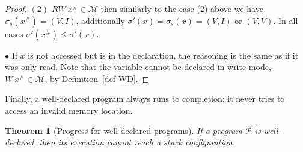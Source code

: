 \documentclass[preprint,12pt]{elsarticle}
\newtheorem{Theorem}{Theorem}
\newcommand{\abs}[1]{#1^\#}
\newcommand{\AM}{\mathcal{M}}
\newcommand{\Prog}{\mathcal{P}}
\begin{document}
\begin{proof}
\noindent$(2)$ $RW~\abs x \in \AM$ then similarly to the case (2) above we have 
$\sigma_s(\abs x)=(V,I)$, additionally $\sigma'(x)=\sigma_s(x)=(V,I)$ or $(V,V)$. In all 
cases $\sigma'(\abs x)\leq\sigma'(x)$.

\noindent$\bullet$ If  $x$ is not accessed but is in the declaration, the 
reasoning is the same as if it was only read. 
Note that the variable cannot be declared 
in write mode, $W~\abs x \in \AM$, by
Definition~\ref{def-WD}.
\end{proof}

Finally, a well-declared program always runs to completion: it never tries to access an 
invalid memory location.

\begin{Theorem}[Progress for well-declared programs]\label{thm-progress}
If a program $\Prog$ is well-declared, then its execution cannot reach a stuck 
configuration.
\end{Theorem}
\end{document}
